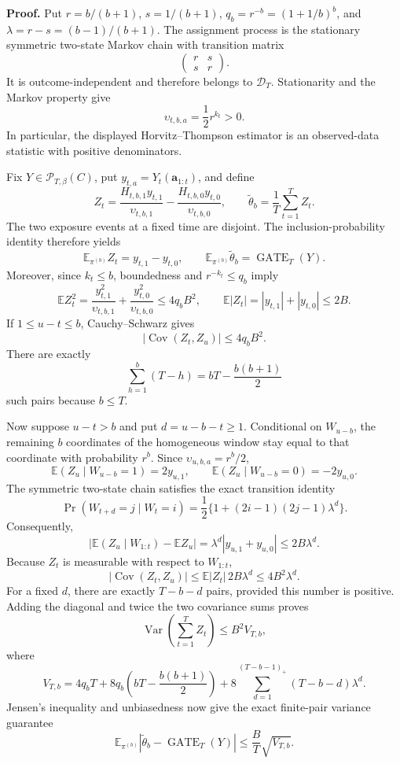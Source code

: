 \textbf{Proof.} Put \(r=b/(b+1)\), \(s=1/(b+1)\), \(q_b=r^{-b}=(1+1/b)^b\), and \(\lambda=r-s=(b-1)/(b+1)\). The assignment process is the stationary symmetric two-state Markov chain with transition matrix
\[
\begin{pmatrix}r&s\\s&r\end{pmatrix}.
\]
It is outcome-independent and therefore belongs to \(\mathcal D_T\). Stationarity and the Markov property give
\[
\upsilon_{t,b,a}=\frac12r^{k_t}>0.
\]
In particular, the displayed Horvitz--Thompson estimator is an observed-data statistic with positive denominators.

Fix \(Y\in\mathcal P_{T,\beta}(C)\), put \(y_{t,a}=Y_t(\mathbf a_{1:t})\), and define
\[
Z_t=\frac{H_{t,b,1}y_{t,1}}{\upsilon_{t,b,1}}-\frac{H_{t,b,0}y_{t,0}}{\upsilon_{t,b,0}},
\qquad
\widetilde\theta_b=\frac1T\sum_{t=1}^T Z_t.
\]
The two exposure events at a fixed time are disjoint. The inclusion-probability identity therefore yields
\[
\mathbb E_{\pi^{(b)}}Z_t=y_{t,1}-y_{t,0},
\qquad
\mathbb E_{\pi^{(b)}}\widetilde\theta_b=\operatorname{GATE}_T(Y).
\]
Moreover, since \(k_t\le b\), boundedness and \(r^{-k_t}\le q_b\) imply
\[
\mathbb E Z_t^2
=\frac{y_{t,1}^2}{\upsilon_{t,b,1}}+\frac{y_{t,0}^2}{\upsilon_{t,b,0}}
\le 4q_bB^2,
\qquad
\mathbb E|Z_t|=|y_{t,1}|+|y_{t,0}|\le2B.
\]
If \(1\le u-t\le b\), Cauchy--Schwarz gives
\[
|\operatorname{Cov}(Z_t,Z_u)|\le4q_bB^2.
\]
There are exactly
\[
\sum_{h=1}^b(T-h)=bT-\frac{b(b+1)}2
\]
such pairs because \(b\le T\).

Now suppose \(u-t>b\) and put \(d=u-b-t\ge1\). Conditional on \(W_{u-b}\), the remaining \(b\) coordinates of the homogeneous window stay equal to that coordinate with probability \(r^b\). Since \(\upsilon_{u,b,a}=r^b/2\),
\[
\mathbb E(Z_u\mid W_{u-b}=1)=2y_{u,1},
\qquad
\mathbb E(Z_u\mid W_{u-b}=0)=-2y_{u,0}.
\]
The symmetric two-state chain satisfies the exact transition identity
\[
\Pr(W_{t+d}=j\mid W_t=i)
=\frac12\{1+(2i-1)(2j-1)\lambda^d\}.
\]
Consequently,
\[
\left|\mathbb E(Z_u\mid W_{1:t})-\mathbb EZ_u\right|
=\lambda^d|y_{u,1}+y_{u,0}|
\le2B\lambda^d.
\]
Because \(Z_t\) is measurable with respect to \(W_{1:t}\),
\[
|\operatorname{Cov}(Z_t,Z_u)|
\le \mathbb E|Z_t|\,2B\lambda^d
\le4B^2\lambda^d.
\]
For a fixed \(d\), there are exactly \(T-b-d\) pairs, provided this number is positive. Adding the diagonal and twice the two covariance sums proves
\[
\operatorname{Var}\left(\sum_{t=1}^TZ_t\right)
\le B^2V_{T,b},
\]
where
\[
V_{T,b}=4q_bT+8q_b\left(bT-\frac{b(b+1)}2\right)
+8\sum_{d=1}^{(T-b-1)_+}(T-b-d)\lambda^d.
\]
Jensen's inequality and unbiasedness now give the exact finite-pair variance guarantee
\[
\mathbb E_{\pi^{(b)}}
\left|\widetilde\theta_b-\operatorname{GATE}_T(Y)\right|
\le\frac BT\sqrt{V_{T,b}}.
\]

